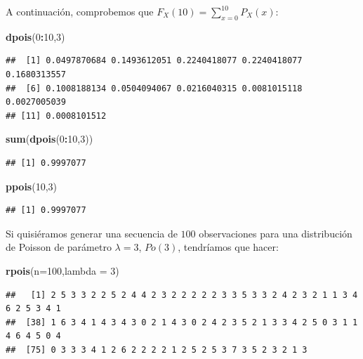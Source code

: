 \documentclass[]{book}
\newenvironment{Shaded}{\begin{snugshade}}{\end{snugshade}}
\newcommand{\DataTypeTok}[1]{\textcolor[rgb]{0.13,0.29,0.53}{#1}}
\newcommand{\DecValTok}[1]{\textcolor[rgb]{0.00,0.00,0.81}{#1}}
\newcommand{\KeywordTok}[1]{\textcolor[rgb]{0.13,0.29,0.53}{\textbf{#1}}}
\newcommand{\NormalTok}[1]{#1}
\newcommand{\OperatorTok}[1]{\textcolor[rgb]{0.81,0.36,0.00}{\textbf{#1}}}
\begin{document}
A continuación, comprobemos que \(F_X(10)=\sum\limits_{x=0}^{10} P_X(x)\):

\begin{Shaded}
\begin{Highlighting}[]
\KeywordTok{dpois}\NormalTok{(}\DecValTok{0}\OperatorTok{:}\DecValTok{10}\NormalTok{,}\DecValTok{3}\NormalTok{)}
\end{Highlighting}
\end{Shaded}

\begin{verbatim}
##  [1] 0.0497870684 0.1493612051 0.2240418077 0.2240418077 0.1680313557
##  [6] 0.1008188134 0.0504094067 0.0216040315 0.0081015118 0.0027005039
## [11] 0.0008101512
\end{verbatim}

\begin{Shaded}
\begin{Highlighting}[]
\KeywordTok{sum}\NormalTok{(}\KeywordTok{dpois}\NormalTok{(}\DecValTok{0}\OperatorTok{:}\DecValTok{10}\NormalTok{,}\DecValTok{3}\NormalTok{))}
\end{Highlighting}
\end{Shaded}

\begin{verbatim}
## [1] 0.9997077
\end{verbatim}

\begin{Shaded}
\begin{Highlighting}[]
\KeywordTok{ppois}\NormalTok{(}\DecValTok{10}\NormalTok{,}\DecValTok{3}\NormalTok{)}
\end{Highlighting}
\end{Shaded}

\begin{verbatim}
## [1] 0.9997077
\end{verbatim}

Si quisiéramos generar una secuencia de \(100\) observaciones para una distribución de Poisson de parámetro \(\lambda=3\), \(Po(3)\), tendríamos que hacer:

\begin{Shaded}
\begin{Highlighting}[]
\KeywordTok{rpois}\NormalTok{(}\DataTypeTok{n=}\DecValTok{100}\NormalTok{,}\DataTypeTok{lambda =} \DecValTok{3}\NormalTok{)}
\end{Highlighting}
\end{Shaded}

\begin{verbatim}
##   [1] 2 5 3 3 2 2 5 2 4 4 2 3 2 2 2 2 2 3 3 5 3 3 2 4 2 3 2 1 1 3 4 6 2 5 3 4 1
##  [38] 1 6 3 4 1 4 3 4 3 0 2 1 4 3 0 2 4 2 3 5 2 1 3 3 4 2 5 0 3 1 1 4 6 4 5 0 4
##  [75] 0 3 3 3 4 1 2 6 2 2 2 2 1 2 5 2 5 3 7 3 5 2 3 2 1 3
\end{verbatim}
\end{document}
